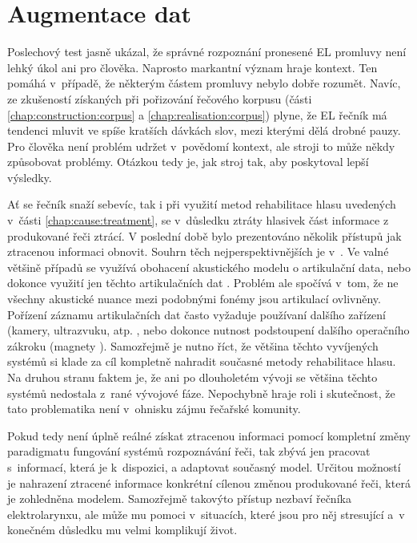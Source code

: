 \section{Augmentace dat}
\label{chap:realisation:augmentation}

Poslechový test jasně ukázal, že správné rozpoznání pronesené EL promluvy není lehký úkol ani pro člověka.
Naprosto markantní význam hraje kontext.
Ten pomáhá v~případě, že některým částem promluvy nebylo dobře rozumět.
Navíc, ze zkušeností získaných při pořizování řečového korpusu (části \ref{chap:construction:corpus} a \ref{chap:realisation:corpus}) plyne, že EL řečník má tendenci mluvit ve spíše kratších dávkách slov, mezi kterými dělá drobné pauzy.
Pro člověka není problém udržet v~povědomí kontext, ale stroji to může někdy způsobovat problémy.
Otázkou tedy je, jak  stroj tak, aby poskytoval lepší výsledky.

Ať se řečník snaží sebevíc, tak i při využití metod rehabilitace hlasu uvedených v~části \ref{chap:cause:treatment}, se v~důsledku ztráty hlasivek část informace z produkované řeči ztrácí.
V poslední době bylo prezentováno několik přístupů jak ztracenou informaci obnovit.
Souhrn těch nejperspektivnějších je v~\cite{Denby2010}.
Ve valné většině případů se využívá obohacení akustického modelu o artikulační data, nebo dokonce využití jen těchto artikulačních dat \cite{Hofe2013} .
Problém ale spočívá v~tom, že ne všechny akustické nuance mezi podobnými fonémy jsou artikulací ovlivněny.
Pořízení záznamu artikulačních dat často vyžaduje používaní dalšího zařízení (kamery, ultrazvuku, atp. \cite{Hueber2010, Fagan2008, Jorgensen2010, Hirahara2010},
nebo dokonce nutnost podstoupení dalšího operačního zákroku (magnety \cite{Hofe2011}).
Samozřejmě je nutno říct, že většina těchto vyvíjených systémů si klade za cíl kompletně nahradit současné metody rehabilitace hlasu.
Na druhou stranu faktem je, že ani po dlouholetém vývoji se většina těchto systémů nedostala z~rané vývojové fáze.
Nepochybně hraje roli i skutečnost, že tato problematika není v~ohnisku zájmu řečařské komunity.

Pokud tedy není úplně reálné získat ztracenou informaci pomocí kompletní změny paradigmatu fungování systémů rozpoznávání řeči, tak zbývá jen pracovat s~informací, která je  k~dispozici, a adaptovat současný model.
Určitou možností je nahrazení ztracené informace konkrétní cílenou změnou produkované řeči,
která je zohledněna modelem.
Samozřejmě takovýto přístup nezbaví řečníka elektrolarynxu, ale může mu pomoci v~situacích, které jsou pro něj stresující a~v konečném důsledku mu velmi komplikují život.


